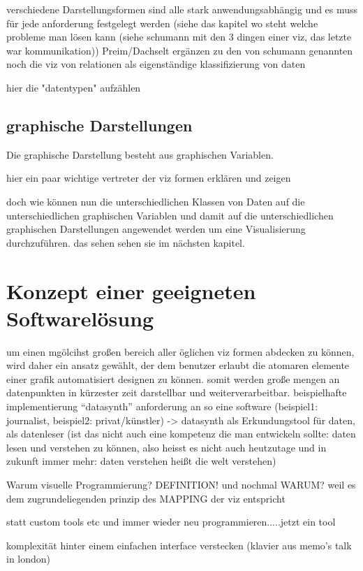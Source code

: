 \documentclass[a4paper, 12pt, DIVcalc, onepage, pdftex, headsepline, footsepline]{scrreprt}
\begin{document}
verschiedene Darstellungsformen
sind alle stark anwendungsabhängig und es muss für jede anforderung festgelegt werden (siehe das kapitel wo steht welche probleme man lösen kann (siehe schumann mit den 3 dingen einer viz, das letzte war kommunikation))
Preim/Dachselt ergänzen zu den von schumann genannten noch die viz von relationen als eigenständige klassifizierung von daten

hier die "datentypen" aufzählen

\section{graphische Darstellungen}
\label{sec:Darstellungen}
Die graphische Darstellung besteht aus graphischen Variablen.

hier ein paar wichtige vertreter der viz formen erklären und zeigen

doch wie können nun die unterschiedlichen Klassen von Daten auf die unterschiedlichen graphischen Variablen und damit
auf die unterschiedlichen graphischen Darstellungen angewendet werden um eine Visualisierung durchzuführen. das sehen
sehen sie im nächsten kapitel.

\chapter{Konzept einer geeigneten Softwarelösung}
\label{cha:Software}
um einen mgölcihst großen bereich aller öglichen viz formen abdecken zu können, wird daher ein ansatz gewählt, der dem benutzer erlaubt die atomaren elemente einer grafik automatisiert designen zu können. somit werden große mengen an datenpunkten in kürzester zeit darstellbar und weiterverarbeitbar.
beispielhafte implementierung “datasynth”
anforderung an so eine software (beispiel1: journalist, beispiel2: privat/künstler)
-> datasynth als Erkundungstool für daten, als datenleser (ist das nicht auch eine kompetenz die man entwickeln sollte: daten lesen und verstehen zu können, also heisst es nicht auch heutzutage und in zukunft immer mehr: daten verstehen heißt die welt verstehen)

Warum visuelle Programmierung? DEFINITION! und nochmal WARUM?
weil es dem zugrundeliegenden prinzip des MAPPING der viz entspricht

statt custom tools etc und immer wieder neu programmieren.....jetzt ein tool

komplexität hinter einem einfachen interface verstecken (klavier aus memo’s talk in london)
\end{document}
